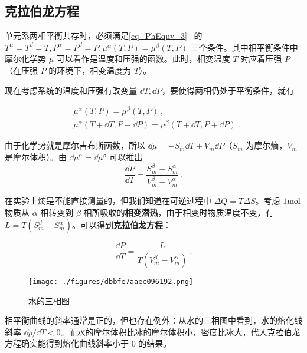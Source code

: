 
\begin{issues}
\issueDraft
\end{issues}


\subsection{克拉伯龙方程}
单元系两相平衡共存时，必须满足\autoref{eq_PhEquv_3}~ 的 $T^\alpha=T^\beta=T,P^\alpha=P^\beta=P,\mu^\alpha(T,P)=\mu^\beta(T,P)$ 三个条件。其中相平衡条件中摩尔化学势 $\mu$ 可以看作是温度和压强的函数。此时，相变温度 $T$ 对应着压强 $P$（在压强 $P$ 的环境下，相变温度为 $T$）。

现在考虑系统的温度和压强有改变量 $\dd T,\dd P$，要使得两相仍处于平衡条件，就有

\begin{align}
&\mu^\alpha(T,P)=\mu^\beta(T,P)~,\\
&\mu^\alpha(T+\dd T,P+\dd P)=\mu^\beta(T+\dd T,P+\dd P)~.
\end{align}

由于化学势就是摩尔吉布斯函数，所以 $\dd\mu=-S_m\dd T+V_m\dd P$（$S_m$ 为摩尔熵，$V_m$ 是摩尔体积）。由 $\dd \mu^\alpha=\dd \mu^\beta$ 可以推出
\begin{equation}
\frac{\dd P}{\dd T}=\frac{S^\beta_m-S^\alpha_m}{V^\beta_m-V^\alpha_m}~.
\end{equation}

在实验上熵是不能直接测量的，但我们知道在可逆过程中 $\Delta Q=T\Delta S$。考虑 $1\rm mol$ 物质从 $\alpha$ 相转变到 $\beta$ 相所吸收的\textbf{相变潜热}，由于相变时物质温度不变，有 $L=T(S_m^\beta-S_m^\alpha)$。可以得到\textbf{克拉伯龙方程}：

\begin{equation}\label{eq_Clapey_1}
\frac{\dd P}{\dd T}=\frac{L}{T(V^\beta_m-V^\alpha_m)}~.
\end{equation}
\begin{figure}[ht]
\centering
\texttt{[image: ./figures/dbbfe7aaec096192.png]}
\caption{水的三相图} \label{fig_Clapey_1}
\end{figure}

相平衡曲线的斜率通常是正的，但也存在例外：从水的三相图中看到，水的熔化线斜率 $\dd p/\dd T<0$。而水的摩尔体积比冰的摩尔体积小，密度比冰大，代入克拉伯龙方程确实能得到熔化曲线斜率小于 $0$ 的结果。

